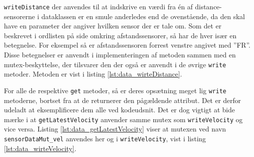 \texttt{writeDistance} der anvendes til at indskrive en værdi fra én af distance-sensorerne i dataklassen er en smule anderledes end de ovenstående, da den skal have en parameter der angiver hvilken sensor der er tale om. Som det er beskrevet i ordlisten på side \pageref{sec:ordforklaring} omkring afstandssensorer, så har de hver især en betegnelse. For eksempel så er afstandssensoren forrest venstre angivet med ''FR''. Disse betegnelser er anvendt i implementeringen af metoden sammen med en mutex-beskyttelse, der tilsvarer den der også er anvendt i de øvrige \texttt{write} metoder. Metoden er vist i listing \ref{lst:data_wirteDistance}.



For alle de respektive \texttt{get} metoder, så er deres opsætning meget lig \texttt{write} metoderne, bortset fra at de returnerer den pågældende attribut. Det er derfor udeladt at eksemplificere dem alle ved kodeudsnit. Det er dog vigtigt at bide mærke i at \texttt{getLatestVelocity} anvender samme mutex som \texttt{writeVelocity} og vice versa. Listing \ref{lst:data_getLatestVelocity} viser at mutexen ved navn \texttt{sensorDataMut\_vel} anvendes her og i \texttt{writeVelocity}, vist i listing \ref{lst:data_wirteVelocity}.

